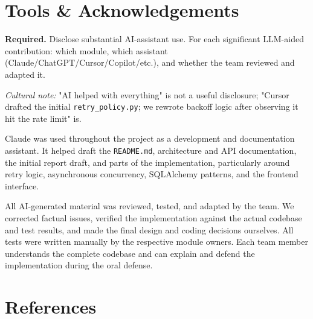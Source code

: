 \documentclass[11pt,a4paper]{article}
\newenvironment{deliverbox}{\begin{deliverboxshown}}{\end{deliverboxshown}}
\newenvironment{probebox}{\begin{probeboxshown}}{\end{probeboxshown}}
\newenvironment{deliverbox}{\setbox0\vbox\bgroup}{\egroup\ignorespacesafterend}
\newenvironment{probebox}{\setbox0\vbox\bgroup}{\egroup\ignorespacesafterend}
\begin{document}
\section{Tools \& Acknowledgements}\label{sec:tools}

\begin{deliverbox}
\textbf{Required.} Disclose substantial AI-assistant use. For each significant LLM-aided contribution: which module, which assistant (Claude/ChatGPT/Cursor/Copilot/etc.), and whether the team reviewed and adapted it.
\end{deliverbox}

\begin{probebox}
\textit{Cultural note:} "AI helped with everything" is not a useful disclosure; "Cursor drafted the initial \texttt{retry\_policy.py}; we rewrote backoff logic after observing it hit the rate limit" is.
\end{probebox}

 
 

\par\noindent
Claude was used throughout the project as a development and documentation assistant. It helped draft the \texttt{README.md}, architecture and API documentation, the initial report draft, and parts of the implementation, particularly around retry logic, asynchronous concurrency, SQLAlchemy patterns, and the frontend interface.

All AI-generated material was reviewed, tested, and adapted by the team. We corrected factual issues, verified the implementation against the actual codebase and test results, and made the final design and coding decisions ourselves. All tests were written manually by the respective module owners. Each team member understands the complete codebase and can explain and defend the implementation during the oral defense.




\section*{References}
\end{document}

